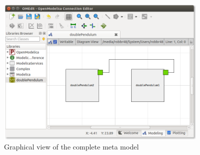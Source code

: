 \documentclass[a4paper,12pt]{include/opencpsreport}
\begin{document}
\begin{figure}[ht]
\centering
\includegraphics[width=0.9\textwidth]{gfx/metamodel.png}
\caption{Graphical view of the complete meta model}
\label{fig:metamodel_omedit}
\end{figure}





\clearpage
{}
\end{document}
